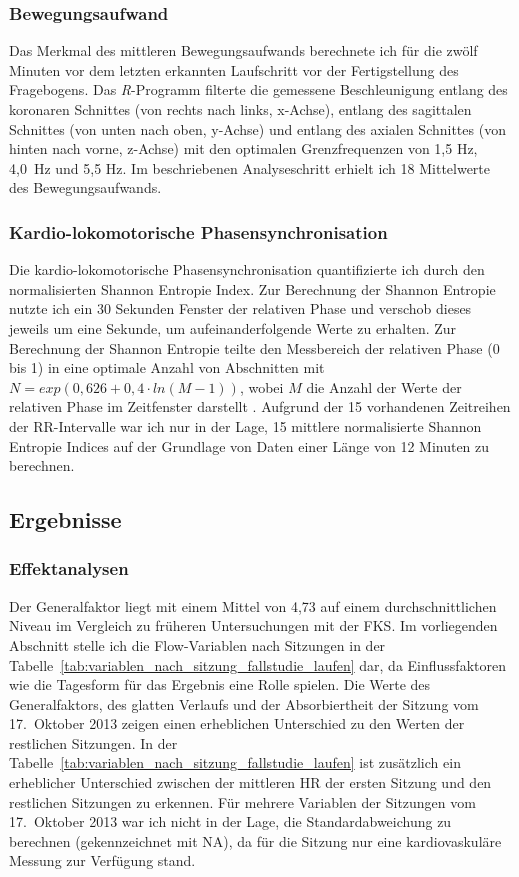 \subsubsection{Bewegungsaufwand}
\label{ssub:bewegungsaufwand_1}
Das Merkmal des mittleren Bewegungsaufwands berechnete ich für die zwölf Minuten vor dem letzten erkannten Laufschritt vor der Fertigstellung des Fragebogens. Das \emph{R}-Programm filterte die gemessene Beschleunigung entlang des koronaren Schnittes (von rechts nach links, x-Achse), entlang des sagittalen Schnittes (von unten nach oben, y-Achse) und entlang des axialen Schnittes (von hinten nach vorne, z-Achse) mit den optimalen Grenzfrequenzen von 1,5 Hz, 4,0~Hz und 5,5 Hz. Im beschriebenen Analyseschritt erhielt ich 18 Mittelwerte des Bewegungsaufwands.

\subsubsection{Kardio-lokomotorische Phasensynchronisation}
\label{ssub:kardio_lokomotorische_phasensynchronisation_1}
Die kardio-lokomotorische Phasensynchronisation quantifizierte ich durch den normalisierten Shannon Entropie Index. Zur Berechnung der Shannon Entropie nutzte ich ein 30 Sekunden Fenster der relativen Phase und verschob dieses jeweils um eine Sekunde, um aufeinanderfolgende Werte zu erhalten. Zur Berechnung der Shannon Entropie teilte den Messbereich der relativen Phase (0 bis 1) in eine optimale Anzahl von Abschnitten mit $N = exp(0{,}626 + 0{,}4 \cdot ln(M-1))$, wobei $M$ die Anzahl der Werte der relativen Phase im Zeitfenster darstellt \citep[vgl.][S.~20]{Rosenblum2003}. Aufgrund der 15 vorhandenen Zeitreihen der RR-Intervalle war ich nur in der Lage, 15 mittlere normalisierte Shannon Entropie Indices auf der Grundlage von Daten einer Länge von 12 Minuten zu berechnen.

\subsection{Ergebnisse}
\subsubsection{Effektanalysen}
Der Generalfaktor liegt mit einem Mittel von 4,73 auf einem durchschnittlichen Niveau im Vergleich zu früheren Untersuchungen mit der \ac{FKS}. Im vorliegenden Abschnitt stelle ich die Flow-Variablen nach Sitzungen in der Tabelle~\ref{tab:variablen_nach_sitzung_fallstudie_laufen} dar, da Einflussfaktoren wie die Tagesform für das Ergebnis eine Rolle spielen. Die Werte des Generalfaktors, des glatten Verlaufs und der Absorbiertheit der Sitzung vom 17.~Oktober 2013 zeigen einen erheblichen Unterschied zu den Werten der restlichen Sitzungen. In der Tabelle~\ref{tab:variablen_nach_sitzung_fallstudie_laufen} ist zusätzlich ein erheblicher Unterschied zwischen der mittleren \ac{HR} der ersten Sitzung und den restlichen Sitzungen zu erkennen. Für mehrere Variablen der Sitzungen vom 17.~Oktober 2013 war ich nicht in der Lage, die Standardabweichung zu berechnen (gekennzeichnet mit NA), da für die Sitzung nur eine kardiovaskuläre Messung zur Verfügung stand.

